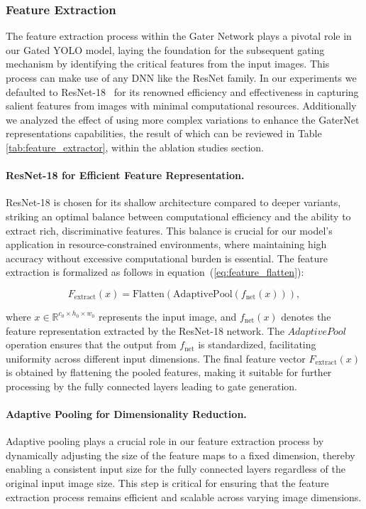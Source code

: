 \subsubsection{Feature Extraction}
The feature extraction process within the Gater Network plays a pivotal role in our Gated YOLO model, laying the foundation for the subsequent gating mechanism by identifying the critical features from the input images. This process can make use of any DNN like the ResNet family. In our experiments we defaulted to ResNet-18~\cite{he2016deep} for its renowned efficiency and effectiveness in capturing salient features from images with minimal computational resources. Additionally we analyzed the effect of using more complex variations to enhance the GaterNet representations capabilities, the result of which can be reviewed in Table \ref{tab:feature_extractor}, within the ablation studies section.

\paragraph{ResNet-18 for Efficient Feature Representation.} ResNet-18 is chosen for its shallow architecture compared to deeper variants, striking an optimal balance between computational efficiency and the ability to extract rich, discriminative features. This balance is crucial for our model's application in resource-constrained environments, where maintaining high accuracy without excessive computational burden is essential. The feature extraction is formalized as follows in equation~(\ref{eq:feature_flatten}):

\begin{equation}
    F_{\text{extract}}(x) = \text{Flatten}(\text{AdaptivePool}(f_{\text{net}}(x))),
    \label{eq:feature_flatten}
\end{equation}

\noindent{}where \(x \in \mathbb{R}^{c_0 \times h_0 \times w_0}\) represents the input image, and \(f_{\text{net}}(x)\) denotes the feature representation extracted by the ResNet-18 network. The \(AdaptivePool\) operation ensures that the output from \(f_{\text{net}}\) is standardized, facilitating uniformity across different input dimensions. The final feature vector \(F_{\text{extract}}(x)\) is obtained by flattening the pooled features, making it suitable for further processing by the fully connected layers leading to gate generation.

\paragraph{Adaptive Pooling for Dimensionality Reduction.} Adaptive pooling plays a crucial role in our feature extraction process by dynamically adjusting the size of the feature maps to a fixed dimension, thereby enabling a consistent input size for the fully connected layers regardless of the original input image size. This step is critical for ensuring that the feature extraction process remains efficient and scalable across varying image dimensions.

